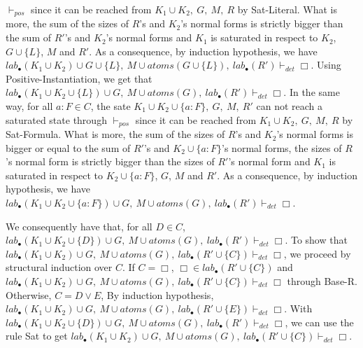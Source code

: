 \documentclass[a4paper,10pt]{article}
\newcommand{\atoms}{\mathit{atoms}}
\newcommand{\pos}{\vdash_\mathit{pos}}
\newcommand{\dett}{\vdash_\mathit{det}}
\newcommand{\T}{\mathit{lab}}
\begin{document}
\begin{itemize}
$\pos$ since it can be reached from $K_1\cup K_2,\ G,\ M,\ R$ by {\sc Sat-Literal}.
What is more, the sum of the sizes of $R$'s and $K_2$'s normal forms
is strictly bigger than the sum of $R'$'s and $K_2$'s
normal forms and $K_1$ is saturated in respect to $K_2$, $G\cup\{L\}$, $M$ and $R'$. As a consequence,
by induction hypothesis, we have $\T_\bullet(K_1\cup K_2)\cup G\cup\{L\},\ M\cup\atoms(G\cup\{L\}),\
\T_\bullet(R')\dett\Box$. Using {\sc Positive-Instantiation}, we get that
$\T_\bullet(K_1\cup K_2\cup\{L\})\cup G,\ M\cup\atoms(G),\ \T_\bullet(R')\dett\Box$.
In the same way, for all $a:F\in C$, the sate $K_1\cup K_2\cup\{a:F\},\ G,\ M,\ R'$ can not reach a
saturated state through $\pos$ since it can be reached from $K_1\cup K_2,\ G,\ M,\ R$ by
{\sc Sat-Formula}. What is more, the sum of the sizes of $R$'s and $K_2$'s normal forms
is bigger or equal to the sum of $R'$'s and $K_2\cup\{a:F\}$'s
normal forms, the sizes of $R$'s normal form is strictly bigger than the sizes of $R'$'s normal form
and $K_1$ is saturated in respect to $K_2\cup\{a:F\}$, $G$, $M$ and $R'$. As a consequence,
by induction hypothesis, we have $\T_\bullet(K_1\cup K_2\cup\{a:F\})\cup G,\ M\cup\atoms(G),\
\T_\bullet(R')\dett\Box$.

We consequently have that, for all $D\in C$, $\T_\bullet(K_1\cup K_2\cup\{D\})\cup G,\ M\cup\atoms(G),\
\T_\bullet(R')\dett\Box$. To show that $\T_\bullet(K_1\cup K_2)\cup G,\ M\cup\atoms(G),\
\T_\bullet(R'\cup\{C\})\dett\Box$, we proceed by structural induction over $C$.
If $C=\Box$, $\Box\in \T_\bullet(R'\cup\{C\})$ and $\T_\bullet(K_1\cup K_2)\cup G,\ M\cup\atoms(G),\
\T_\bullet(R'\cup\{C\})\dett\Box$ through {\sc Base-R}. Otherwise, $C=D\vee E$,
By induction hypothesis, $\T_\bullet(K_1\cup K_2)\cup G,\ M\cup\atoms(G),\
\T_\bullet(R'\cup\{E\})\dett\Box$. With $\T_\bullet(K_1\cup K_2\cup\{D\})\cup G,\ M\cup\atoms(G),\
\T_\bullet(R')\dett\Box$, we can use the rule {\sc Sat} to get
$\T_\bullet(K_1\cup K_2)\cup G,\ M\cup\atoms(G),\ \T_\bullet(R'\cup\{C\})\dett\Box$.
\end{itemize} 
\end{document}
